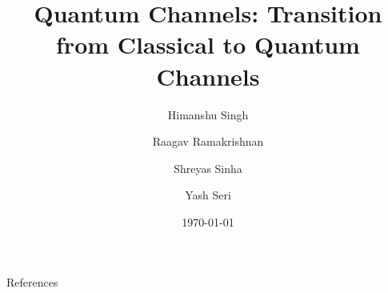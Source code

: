 \documentclass[a4paper, 9pt]{beamer}
\title{Quantum Channels: Transition from Classical to Quantum Channels}
\author{Himanshu Singh \and Raagav Ramakrishnan \and Shreyas Sinha \and Yash Seri}
\date{\today}
\newcommand{\pageauthor}{}
\begin{document}
\begin{frame}
    \titlepage
\end{frame}

\begin{frame}
    \tableofcontents
\end{frame}

\renewcommand{\pageauthor}{Author 1}



\renewcommand{\pageauthor}{Author 2}



\renewcommand{\pageauthor}{Himanshu Singh}



\renewcommand{\pageauthor}{Shreyas Sinha}



\renewcommand{\pageauthor}{}
\begin{frame}{References}
    \printbibliography[heading=none]
\end{frame}
\end{document}
